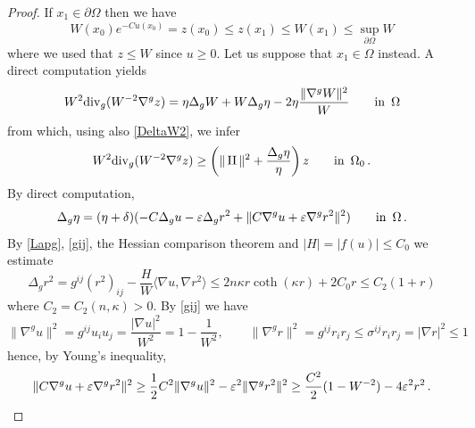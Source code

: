 \documentclass[10 pt,a4paper]{article}
\theoremstyle{definition}
\begin{document}
\begin{proof}
	If $x_1\in\partial\Omega$ then we have
	\begin{equation} \label{West1}
		W(x_0) e^{-Cu(x_0)} = z(x_0) \leq z(x_1) \leq W(x_1) \leq \sup_{\partial\Omega} W
	\end{equation}
	where we used that $z \leq W$ since $u\geq 0$. %
	Let us suppose that $x_1\in\Omega$ instead. A direct computation yields
	\[
		W^2 \mathrm{div}_g(W^{-2} \nabla^g z) = \eta \Delta_g W + W\Delta_g\eta - 2 \eta \frac{\|\nabla^g W\|^2}{W} \qquad \text{in } \, \Omega
	\]
	from which, using also \eqref{DeltaW2}, we infer
	\begin{equation} \label{divWz}
		W^2 \mathrm{div}_g(W^{-2} \nabla^g z) \geq \left(\|\operatorname{II}\|^2 + \frac{\Delta_g \eta}{\eta} \right) z \qquad \text{in } \, \Omega_0 \, .
	\end{equation}
	By direct computation,
	\begin{equation} \label{Lapeta}
		\Delta_g \eta = (\eta+\delta)(-C\Delta_g u - \varepsilon\Delta_g r^2 + \|C\nabla^g u + \varepsilon\nabla^g r^2\|^2) \qquad \text{in } \, \Omega \, .
	\end{equation}
	By \eqref{Lapg}, \eqref{gij}, the Hessian comparison theorem and $|H| = |f(u)| \leq C_0$ we estimate
	\begin{equation} \label{Lapr2}
		\Delta_g r^2 = g^{ij} (r^2)_{ij} - \frac{H}{W} \langle \nabla u,\nabla r^2\rangle \leq 2n \kappa r \coth(\kappa r) + 2C_0 r \leq C_2(1+r)
	\end{equation}
	where $C_2 = C_2(n,\kappa) > 0$. By \eqref{gij} we have
	\[
		\|\nabla^g u\|^2 = g^{ij} u_i u_j = \frac{|\nabla u|^2}{W^2} = 1 - \frac{1}{W^2}, \qquad \|\nabla^g r\|^2 = g^{ij} r_i r_j \leq \sigma^{ij} r_i r_j = |\nabla r|^2 \leq 1
	\]
	hence, by Young's inequality,
	\begin{equation} \label{CeYoung}
		\|C\nabla^g u + \varepsilon\nabla^g r^2\|^2 \geq \frac{1}{2} C^2\|\nabla^g u\|^2 - \varepsilon^2 \|\nabla^g r^2\|^2 \geq \frac{C^2}{2} (1-W^{-2}) - 4\varepsilon^2 r^2 \, .
	\end{equation}

\end{proof}
\end{document}
